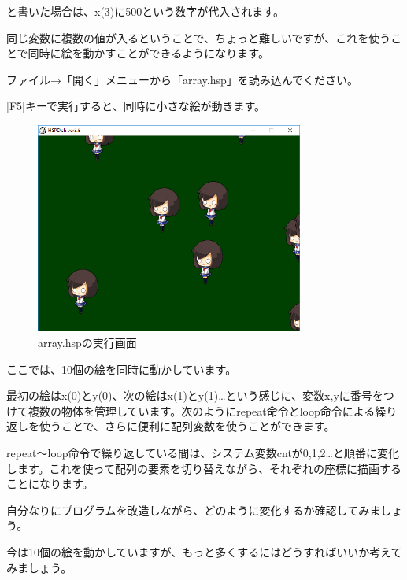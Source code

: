 \begin{description}
    \item {}
    \item {}
\end{description}

と書いた場合は、x(3)に500という数字が代入されます。

同じ変数に複数の値が入るということで、ちょっと難しいですが、これを使うことで同時に絵を動かすことができるようになります。

ファイル→「開く」メニューから「array.hsp」を読み込んでください。

[F5]キーで実行すると、同時に小さな絵が動きます。

\begin{figure}[H]
    \begin{center}
      \includegraphics[keepaspectratio,width=8.811cm,height=6.946cm]{text04-img/text04-img036.png}
      \caption{array.hspの実行画面}
    \end{center}
    \label{fig:prog_menu}
\end{figure}

ここでは、10個の絵を同時に動かしています。

最初の絵はx(0)とy(0)、次の絵はx(1)とy(1)…という感じに、変数x,yに番号をつけて複数の物体を管理しています。次のようにrepeat命令とloop命令による繰り返しを使うことで、さらに便利に配列変数を使うことができます。


\begin{description}
    \item {}
    \item {}
    \item {}
    \item {}
\end{description}

repeat〜loop命令で繰り返している間は、システム変数cntが0,1,2…と順番に変化します。これを使って配列の要素を切り替えながら、それぞれの座標に描画することになります。

自分なりにプログラムを改造しながら、どのように変化するか確認してみましょう。

今は10個の絵を動かしていますが、もっと多くするにはどうすればいいか考えてみましょう。




